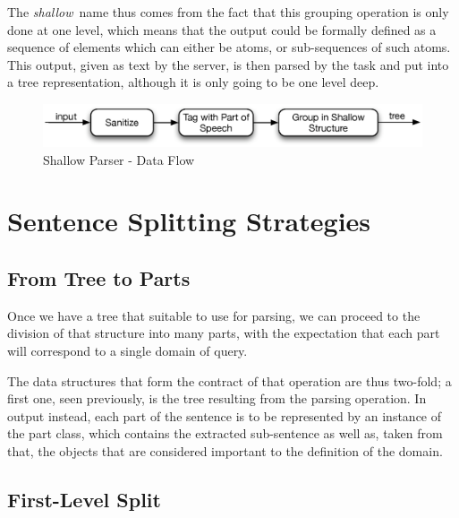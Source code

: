 The \emph{shallow}\ name thus comes from the fact that this grouping operation is only done at one level, which means that the output could be formally defined as a sequence of elements which can either be atoms, or sub-sequences of such atoms. This output, given as text by the server, is then parsed by the task and put into a tree representation, although it is only going to be one level deep.

\begin{figure}[ht!]
  \begin{center}
    \includegraphics[width=\linewidth]{images/shallowparserflow}
  \end{center}
  \caption{Shallow Parser - Data Flow}\label{fig:shallow_parser_flow}
\end{figure}



\section{Sentence Splitting Strategies} %
\label{sec:sentence_splitting_strategies}

\subsection{From Tree to Parts} %
\label{sub:from_tree_to_parts}

Once we have a tree that suitable to use for parsing, we can proceed to the division of that structure into many parts, with the expectation that each part will correspond to a single domain of query.

The data structures that form the contract of that operation are thus two-fold; a first one, seen previously, is the tree resulting from the parsing operation. In output instead, each part of the sentence is to be represented by an instance of the part class, which contains the extracted sub-sentence as well as, taken from that, the objects that are considered important to the definition of the domain.


\subsection{First-Level Split} %
\label{sub:first_level_split}

